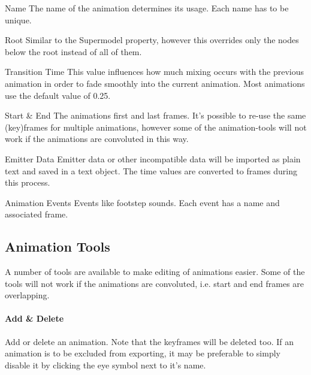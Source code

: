 \begin{propertyAurora}{Name}
    The name of the animation determines its usage. Each name has to be unique.
\end{propertyAurora}

\begin{propertyAurora}{Root}
    Similar to the Supermodel property, however this overrides only the 
    nodes below the root instead of all of them.
\end{propertyAurora}

\begin{propertyAurora}{Transition Time}
    This value influences how much mixing occurs with the previous animation in order to 
    fade smoothly into the current animation. Most animations use the default value of 0.25.
\end{propertyAurora}

\begin{propertyAurora}{Start \& End}
    The animations first and last frames. It's possible to re-use the same (key)frames for 
    multiple animations, however some of the animation-tools will not work if the animations are 
    convoluted in this way.
\end{propertyAurora}

\begin{propertyAurora}{Emitter Data}
    Emitter data or other incompatible data will be imported as plain text and saved in a text object. The
    time values are converted to frames during this process.
\end{propertyAurora}

\begin{propertyAurora}{Animation Events}
    Events like footstep sounds. Each event has a name and associated frame.
\end{propertyAurora}

\subsection{Animation Tools}
A number of tools are available to make editing of animations easier. Some 
of the tools will not work if the animations are convoluted, i.e. start and 
end frames are overlapping.

\paragraph{Add \& Delete} Add or delete an animation. Note that the keyframes will be deleted too. If an animation is to be excluded from exporting, it may be preferable to simply disable it by clicking the eye symbol next to it's name.

